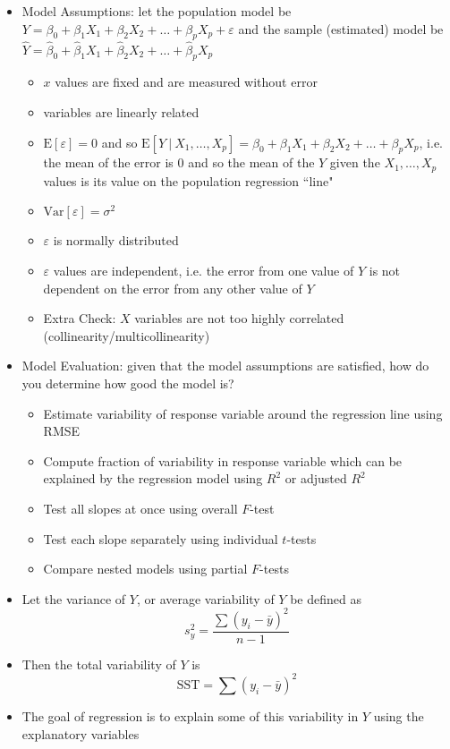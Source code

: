 \documentclass[12pt]{article}
\begin{document}
\begin{itemize}
\item Model Assumptions: let the population model be $Y = \beta_0 + \beta_1X_1 + \beta_2X_2 + \dots + \beta_pX_p + \varepsilon$ and the sample (estimated) model be $\hat{Y} = \hat{\beta}_0 + \hat{\beta}_1X_1 + \hat{\beta}_2X_2 + \dots + \hat{\beta}_pX_p$ \begin{itemize}
\item $x$ values are fixed and are measured without error
\item variables are linearly related 
\item $\text{E}[\varepsilon] = 0$ and so $\text{E}[Y~|~X_1,\dots,X_p] = \beta_0 + \beta_1X_1 + \beta_2X_2 + \dots + \beta_pX_p$, i.e. the mean of the error is $0$ and so the mean of the $Y$ given the $X_1,\dots,X_p$ values is its value on the population regression ``line"
\item $\text{Var}[\varepsilon] = \sigma^2$ 
\item $\varepsilon$ is normally distributed 
\item $\varepsilon$ values are independent, i.e. the error from one value of $Y$ is not dependent on the error from any other value of $Y$ 
\item Extra Check: $X$ variables are not too highly correlated (collinearity/multicollinearity) \end{itemize} 
\item Model Evaluation: given that the model assumptions are satisfied, how do you determine how good the model is? \begin{itemize} 
\item Estimate variability of response variable around the regression line using RMSE
\item Compute fraction of variability in response variable which can be explained by the regression model using $R^2$ or adjusted $R^2$
\item Test all slopes at once using overall $F$-test
\item Test each slope separately using individual $t$-tests
\item Compare nested models using partial $F$-tests \end{itemize} 
\item Let the variance of $Y$, or average variability of $Y$ be defined as 
$$s_y^2 = \frac{\sum (y_i - \bar{y})^2}{n-1}$$ 
\item Then the total variability of $Y$ is $$ \text{SST} = \sum (y_i - \bar{y})^2 $$ 
\item The goal of regression is to explain some of this variability in $Y$ using the explanatory variables

\end{itemize}
\end{document}
